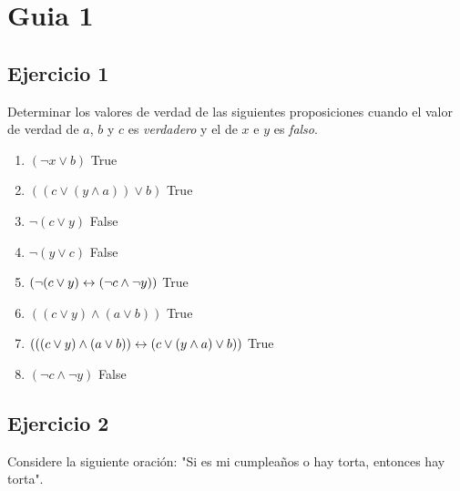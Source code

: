 




\maketitle
\newpage

\tableofcontents
\newpage

\section{Guia 1}

\subsection{Ejercicio 1}
Determinar los valores de verdad de las siguientes proposiciones cuando el valor de verdad de $a$, $b$ y $c$ es \textit{verdadero} y el de $x$ e $y$ es \textit{falso}.

\begin{multicols}{2}
    \begin{enumerate}[label=\alph*)]
        \item $(\neg x \lor b)$ True
        \item $((c \lor (y \land a)) \lor b)$ True
        \item $\neg (c \lor y)$ False
        \item $\neg (y \lor c)$ False
        \item $(\neg(c \lor y) \leftrightarrow (\neg c \land \neg y))$ True
        \item $((c \lor y) \land (a \lor b))$ True
        \item $(((c \lor y) \land (a \lor b)) \leftrightarrow (c \lor (y \land a) \lor b))$ True
        \item $(\neg c \land \neg y)$ False
    \end{enumerate}
\end{multicols}

\subsection{Ejercicio 2}
Considere la siguiente oración: "Si es mi cumpleaños o hay torta, entonces hay torta".

